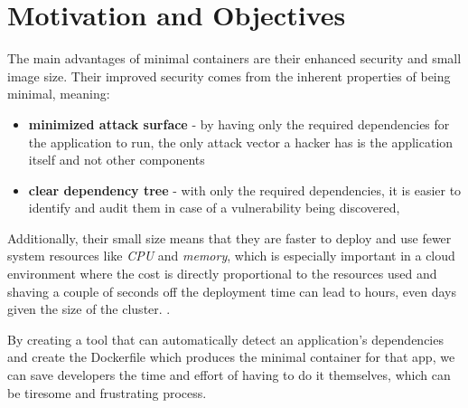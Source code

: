 \chapter{Motivation and Objectives}
\label{chap:motivation-and-objectives}

The main advantages of minimal containers are their enhanced security and
small image size.
Their improved security comes from the inherent properties of being minimal, meaning:
\begin{itemize}
    \item \textbf{minimized attack surface} - by having only the required dependencies for the application to run,
the only attack vector a hacker has is the application itself and not other components
    \item \textbf{clear dependency tree} - with only the required dependencies, it is easier to identify and
audit them in case of a vulnerability being discovered,
\cite{minimal-containers}
\end{itemize}
Additionally, their small size means that they are faster to deploy and use fewer system resources like \textit{CPU} and \textit{memory},
which is especially important in a cloud environment where the cost is directly proportional to the resources used and shaving a
couple of seconds off the deployment time can lead to hours, even days given the size of the cluster. \cite{container-deployment}.

By creating a tool that can automatically detect an application's dependencies and create the Dockerfile which produces the minimal container for that app,
we can save developers the time and effort of having to do it themselves, which can be tiresome and frustrating process.